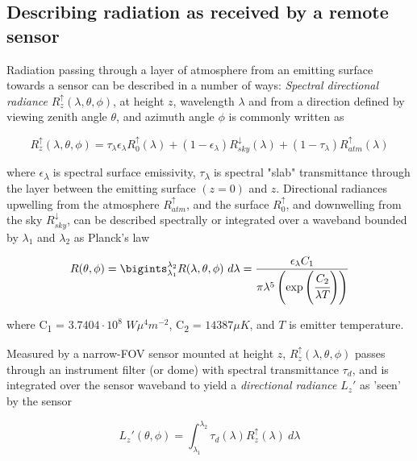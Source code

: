 \begin{bibunit}
\subsection{Describing radiation as received by a remote sensor}

Radiation passing through a layer of atmosphere from an emitting surface towards a sensor can be described in a number of ways: \textit{Spectral directional radiance} $R^\uparrow_z (\lambda, \theta, \phi)$, at height $ z $, wavelength $\lambda$ and from a direction defined by viewing zenith angle \(\theta\), and azimuth angle \(\phi\) is commonly written as

\begin{equation}
R^\uparrow_z (\lambda, \theta, \phi) = \tau_\lambda \epsilon_\lambda R^\uparrow_0(\lambda) + (1-\epsilon_\lambda) R^\downarrow_{sky} (\lambda) + (1-\tau_\lambda) R^\uparrow_{atm}(\lambda)
\end{equation}

\noindent where \(\epsilon\)\textsubscript{\( \lambda \)} is spectral surface emissivity, \(\tau\)\textsubscript{\( \lambda \)} is spectral "slab" transmittance through the layer between the emitting surface $( z  = 0) $ and $ z $. Directional radiances upwelling from the atmosphere $R^\uparrow_{atm}$, and the surface $R^\uparrow_0$, and downwelling from the sky $R^\downarrow_{sky}$, can be described spectrally or integrated over a waveband bounded by \(\lambda_1\) and \(\lambda_2\) as Planck's law

\begin{equation}
R(\theta, \phi) = \bigints_{\lambda_1}^{\lambda_2} R(\lambda,\theta, \phi) ~ d\lambda =\displaystyle\frac{\epsilon_\lambda C_1}{\pi \lambda^5 \left( \exp\left(\cfrac{C_2}{\lambda T}\right)\right)}
\end{equation}

\noindent where C\textsubscript{1} = $ 3.7404 \cdot 10^8 $ $ W\mu^4 m^{-2} $, C\textsubscript{2} = $ 14387 \mu K $, and $T$ is emitter temperature.

Measured by a narrow-FOV sensor mounted at height $ z $, $R^\uparrow_z (\lambda, \theta, \phi)$ passes through an instrument filter (or dome) with spectral transmittance \(\tau_d\), and is integrated over the sensor waveband to yield a \textit{directional radiance} $L_z'$ as 'seen' by the sensor

\begin{equation}
L_z' (\theta, \phi) = \int_{\lambda_1}^{\lambda_2} \tau_d(\lambda) R^\uparrow_z(\lambda) ~ d\lambda
\end{equation}


\end{bibunit}
